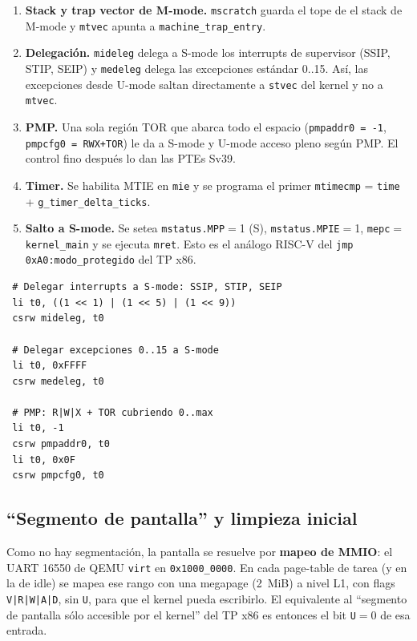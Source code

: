 \begin{enumerate}
  \item \textbf{Stack y trap vector de M-mode.} \texttt{mscratch} guarda el tope de el stack de M-mode y \texttt{mtvec}
  apunta a \texttt{machine\_trap\_entry}.
  \item \textbf{Delegación.} \texttt{mideleg} delega a S-mode los interrupts de supervisor (SSIP, STIP, SEIP) y
  \texttt{medeleg} delega las excepciones estándar 0..15. Así, las excepciones desde U-mode saltan directamente a
  \texttt{stvec} del kernel y no a \texttt{mtvec}.
  \item \textbf{PMP.} Una sola región TOR que abarca todo el espacio (\texttt{pmpaddr0 = -1}, \texttt{pmpcfg0 =
  RWX+TOR}) le da a S-mode y U-mode acceso pleno según PMP. El control fino después lo dan las PTEs Sv39.
  \item \textbf{Timer.} Se habilita MTIE en \texttt{mie} y se programa el primer \texttt{mtimecmp} = \texttt{time} +
  \texttt{g\_timer\_delta\_ticks}.
  \item \textbf{Salto a S-mode.} Se setea \texttt{mstatus.MPP}$=$1 (S), \texttt{mstatus.MPIE}$=$1,
  \texttt{mepc}$=$\texttt{kernel\_main} y se ejecuta \texttt{mret}. Esto es el análogo RISC-V del \texttt{jmp
  0xA0:modo\_protegido} del TP x86.
\end{enumerate}

\begin{codesnippet}
\begin{verbatim}
 # Delegar interrupts a S-mode: SSIP, STIP, SEIP
 li t0, ((1 << 1) | (1 << 5) | (1 << 9))
 csrw mideleg, t0

 # Delegar excepciones 0..15 a S-mode
 li t0, 0xFFFF
 csrw medeleg, t0

 # PMP: R|W|X + TOR cubriendo 0..max
 li t0, -1
 csrw pmpaddr0, t0
 li t0, 0x0F
 csrw pmpcfg0, t0
\end{verbatim}
\end{codesnippet}

\subsection{``Segmento de pantalla'' y limpieza inicial}

Como no hay segmentación, la pantalla se resuelve por \textbf{mapeo de MMIO}: el UART 16550 de QEMU \texttt{virt} en
\texttt{0x1000\_0000}. En cada page-table de tarea (y en la de idle) se mapea ese rango con una megapage (2~MiB) a nivel
L1, con flags \texttt{V|R|W|A|D}, sin \texttt{U}, para que el kernel pueda escribirlo. El equivalente al ``segmento de
pantalla sólo accesible por el kernel'' del TP x86 es entonces el bit \texttt{U}$=$0 de esa entrada.

